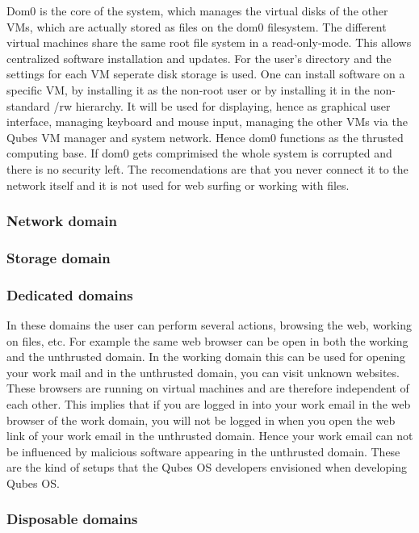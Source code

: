 \documentclass[runningheads,a4paper]{article}
\begin{document}
Dom0 is the core of the system, which manages the virtual disks of the
other VMs, which are actually stored as files on the dom0
filesystem. The different virtual machines share the same root file
system in a read-only-mode. This allows centralized software
installation and updates. For the user's directory and the settings
for each VM seperate disk storage is used. One can install software on
a specific VM, by installing it as the non-root user or by installing
it in the non-standard /rw hierarchy. It will be used for displaying,
hence as graphical user interface, managing keyboard and mouse input,
managing the other VMs via the Qubes VM manager and system
network. Hence dom0 functions as the thrusted computing base. If dom0
gets comprimised the whole system is corrupted and there is no
security left. The recomendations are that you never connect it to the
network itself and it is not used for web surfing or working with
files.

\subsubsection{Network domain}

\subsubsection{Storage domain}

\subsubsection{Dedicated domains}

In these domains the user can perform several actions, browsing the web, working on files, etc. For example the same web browser can be open in both the working and the unthrusted domain. In the working domain this can be used for opening your work mail and in the unthrusted domain, you can visit unknown websites. These browsers are running on virtual machines and are therefore independent of each other. This implies that if you are logged in into your work email in the web browser of the work domain, you will not be logged in when you open the web link of your work email in the unthrusted domain. Hence your work email can not be influenced by malicious software appearing in the unthrusted domain. These are the kind of setups that the Qubes OS developers envisioned when developing Qubes OS.

\subsubsection{Disposable domains}
\end{document}
